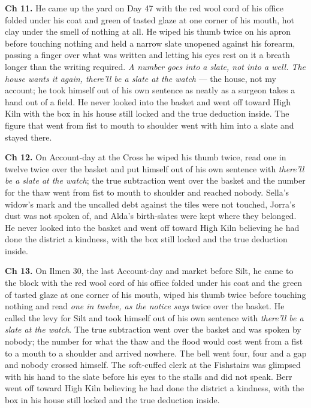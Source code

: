 \documentclass{design/chronicle}
\begin{document}
{\textbf{Ch 11.} He came up the yard on Day 47 with the red wool cord of his office folded under his coat and green of tasted glaze at one corner of his mouth, hot clay under the smell of nothing at all. He wiped his thumb twice on his apron before touching nothing and held a narrow slate unopened against his forearm, passing a finger over what was written and letting his eyes rest on it a breath longer than the writing required. \emph{A number goes into a slate, not into a well. The house wants it again, there’ll be a slate at the watch} --- the house, not my account; he took himself out of his own sentence as neatly as a surgeon takes a hand out of a field. He never looked into the basket and went off toward High Kiln with the box in his house still locked and the true deduction inside. The figure that went from fist to mouth to shoulder went with him into a slate and stayed there.

\textbf{Ch 12.} On Account-day at the Cross he wiped his thumb twice, read one in twelve twice over the basket and put himself out of his own sentence with \emph{there’ll be a slate at the watch}; the true subtraction went over the basket and the number for the thaw went from fist to mouth to shoulder and reached nobody. Sella’s widow’s mark and the uncalled debt against the tiles were not touched, Jorra’s dust was not spoken of, and Alda’s birth-slates were kept where they belonged. He never looked into the basket and went off toward High Kiln believing he had done the district a kindness, with the box still locked and the true deduction inside.

\textbf{Ch 13.} On Ilmen 30, the last Account-day and market before Silt, he came to the block with the red wool cord of his office folded under his coat and the green of tasted glaze at one corner of his mouth, wiped his thumb twice before touching nothing and read \emph{one in twelve, as the notice says} twice over the basket. He called the levy for Silt and took himself out of his own sentence with \emph{there’ll be a slate at the watch}. The true subtraction went over the basket and was spoken by nobody; the number for what the thaw and the flood would cost went from a fist to a mouth to a shoulder and arrived nowhere. The bell went four, four and a gap and nobody crossed himself. The soft-cuffed clerk at the Fishstairs was glimpsed with his hand to the slate before his eyes to the stalls and did not speak. Berr went off toward High Kiln believing he had done the district a kindness, with the box in his house still locked and the true deduction inside.

}
\end{document}
